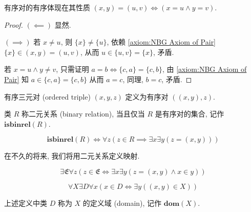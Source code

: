 \begin{lemma}
    有序对的有序体现在其性质 \((x,y) = (u,v) \iff (x = u \land y = v)\).

    \begin{proof}
        \((\impliedby)\) 显然.

        \((\implies)\) 若 \(x \neq u\), 则 \(\{x\} \neq \{u\}\), 依赖 \ref{axiom:NBG Axiom of Pair}
        \(\{x\} \in (x,y) = (u,v)\), 从而 \(u \in \{u, v\} = \{x\}\), 矛盾.

        若 \(x = u \land y \neq v\), 只需证明 \(a = b \iff \{c,a\} = \{c,b\}\), 
        由 \ref{axiom:NBG Axiom of Pair} 知 \(a \in \{c,a\} = \{c,b\}\) 从而 \(a = c\), 同理, 
        \(b = c\), 矛盾.
    \end{proof}
\end{lemma}

\begin{definition}[有序三元对]
    \label {definition:ordered triple}
    有序三元对 (ordered triple) \((x,y,z)\) 定义为有序对 \(((x,y),z)\).
\end{definition}

\begin{definition}[二元关系]
    \label {definition:binary relation}
    类 \(R\) 称二元关系 (binary relation), 当且仅当 \(R\) 是有序对的集合, 记作 \(\mathbf{isbinrel} (R)\).

    \[
        \mathbf{isbinrel} (R) \iff \forall z (z \in R \implies \exists x \exists y (z = (x,y)))
    \]
\end{definition}

在不久的将来, 我们将用二元关系定义映射.

\begin{axiom}
    \label {axiom:NBG Axiom of Membership}
    \[
        \exists \mathfrak{E} \forall z (z \in \mathfrak{E} \iff \exists x \exists y (z = (x,y) \land x \in y))
    \]
\end{axiom}

\begin{axiom}
    \label {axiom:NBG Axiom of Domain}
    \[
        \forall X \exists D \forall x (x \in D \iff \exists y ((x,y) \in X))
    \]
\end{axiom}

\begin{definition}
    \label {definition:domain}
    上述定义中类 \(D\) 称为 \(X\) 的定义域 (domain), 记作 \(\mathbf{dom} (X)\).
\end{definition}

